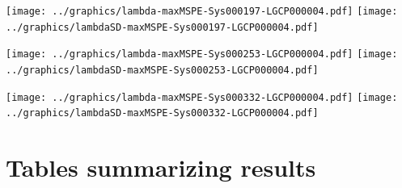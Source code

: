 \documentclass[review]{elsarticle}
\begin{document}
\texttt{[image: ../graphics/lambda-maxMSPE-Sys000197-LGCP000004.pdf]}
\texttt{[image: ../graphics/lambdaSD-maxMSPE-Sys000197-LGCP000004.pdf]}

\texttt{[image: ../graphics/lambda-maxMSPE-Sys000253-LGCP000004.pdf]}
\texttt{[image: ../graphics/lambdaSD-maxMSPE-Sys000253-LGCP000004.pdf]}

\texttt{[image: ../graphics/lambda-maxMSPE-Sys000332-LGCP000004.pdf]}
\texttt{[image: ../graphics/lambdaSD-maxMSPE-Sys000332-LGCP000004.pdf]}


\pagebreak
\section{Tables summarizing results}

\end{document}
